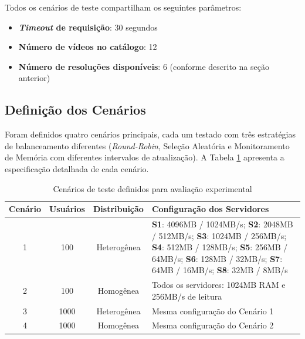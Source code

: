 Todos os cenários de teste compartilham os seguintes parâmetros:

\begin{itemize}
    \item \textbf{\textit{Timeout} de requisição}: 30 segundos
    \item \textbf{Número de vídeos no catálogo}: 12
    \item \textbf{Número de resoluções disponíveis}: 6 (conforme descrito na seção anterior)
\end{itemize}

\subsection{Definição dos Cenários}

Foram definidos quatro cenários principais, cada um testado com três estratégias de balanceamento diferentes (\textit{Round-Robin}, Seleção Aleatória e Monitoramento de Memória com diferentes intervalos de atualização). A Tabela \ref{tab:test-scenarios} apresenta a especificação detalhada de cada cenário.

\begin{table}[htbp]
\centering
\caption{Cenários de teste definidos para avaliação experimental}
\label{tab:test-scenarios}
\small
\begin{tabular}{|c|c|c|p{6.5cm}|}
\hline
\textbf{Cenário} & \textbf{Usuários} & \textbf{Distribuição} & \textbf{Configuração dos Servidores} \\
\hline
1 & 100 & Heterogênea & 
\textbf{S1}: 4096MB / 1024MB/s; \newline
\textbf{S2}: 2048MB / 512MB/s; \newline
\textbf{S3}: 1024MB / 256MB/s; \newline
\textbf{S4}: 512MB / 128MB/s; \newline
\textbf{S5}: 256MB / 64MB/s; \newline
\textbf{S6}: 128MB / 32MB/s; \newline
\textbf{S7}: 64MB / 16MB/s; \newline
\textbf{S8}: 32MB / 8MB/s \\
\hline
2 & 100 & Homogênea & 
Todos os servidores: 1024MB RAM e 256MB/s de leitura \\
\hline
3 & 1000 & Heterogênea & 
Mesma configuração do Cenário 1 \\
\hline
4 & 1000 & Homogênea & 
Mesma configuração do Cenário 2 \\
\hline
\end{tabular}
\end{table}


